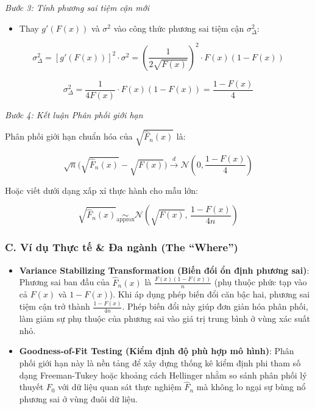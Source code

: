 \documentclass[12pt,a4paper]{article}
\begin{document}
\emph{Bước 3: Tính phương sai tiệm cận mới}

\begin{itemize}

\item
  Thay \(g'(F(x))\) và \(\sigma^2\) vào công thức phương sai tiệm cận \(\sigma_{\Delta}^2\):
\end{itemize}

\[\sigma_{\Delta}^2 = [g'(F(x))]^2 \cdot \sigma^2 = \left(\frac{1}{2\sqrt{F(x)}}\right)^2 \cdot F(x)(1 - F(x))\]

\[\sigma_{\Delta}^2 = \frac{1}{4F(x)} \cdot F(x)(1 - F(x)) = \frac{1 - F(x)}{4}\]

\emph{Bước 4: Kết luận Phân phối giới hạn}

Phân phối giới hạn chuẩn hóa của \(\sqrt{\widehat{F}_n(x)}\) là:

\[\sqrt{n}\Big(\sqrt{\widehat{F}_n(x)} - \sqrt{F(x)}\Big) \xrightarrow{d} \mathcal{N}\left(0, \frac{1 - F(x)}{4}\right)\]

Hoặc viết dưới dạng xấp xỉ thực hành cho mẫu lớn:

\[\sqrt{\widehat{F}_n(x)} \underset{\text{approx}}{\sim} \mathcal{N}\left(\sqrt{F(x)}, \, \frac{1 - F(x)}{4n}\right)\]

\subsubsection{C. Ví dụ Thực tế \& Đa ngành (The ``Where'')}\label{c.-vuxed-dux1ee5-thux1ef1c-tux1ebf-ux111a-nguxe0nh-the-where-2}

\begin{itemize}

\item
  \textbf{Variance Stabilizing Transformation (Biến đổi ổn định phương sai)}: Phương sai ban đầu của \(\widehat{F}_n(x)\) là \(\frac{F(x)(1-F(x))}{n}\) (phụ thuộc phức tạp vào cả \(F(x)\) và \(1-F(x)\)). Khi áp dụng phép biến đổi căn bậc hai, phương sai tiệm cận trở thành \(\frac{1 - F(x)}{4n}\). Phép biến đổi này giúp đơn giản hóa phân phối, làm giảm sự phụ thuộc của phương sai vào giá trị trung bình ở vùng xác suất nhỏ.
\item
  \textbf{Goodness-of-Fit Testing (Kiểm định độ phù hợp mô hình)}: Phân phối giới hạn này là nền tảng để xây dựng thống kê kiểm định phi tham số dạng Freeman-Tukey hoặc khoảng cách Hellinger nhằm so sánh phân phối lý thuyết \(F_0\) với dữ liệu quan sát thực nghiệm \(\widehat{F}_n\) mà không lo ngại sự bùng nổ phương sai ở vùng đuôi dữ liệu.
\end{itemize}
\end{document}
